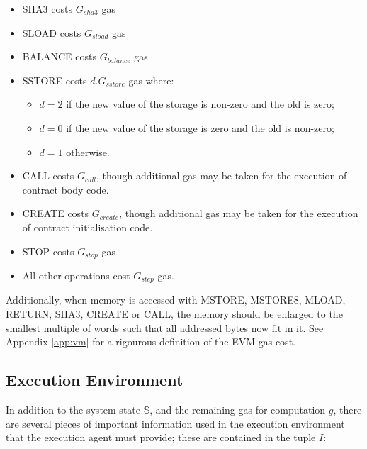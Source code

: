 \documentclass[9pt,oneside]{amsart}
\begin{document}
\begin{multicols}{2}
\begin{itemize}
\item {\small SHA3} costs $G_{sha3}$ gas
\item {\small SLOAD} costs $G_{sload}$ gas
\item {\small BALANCE} costs $G_{balance}$ gas
\item {\small SSTORE} costs $d.G_{sstore}$ gas where:
\begin{itemize}
\item $d = 2$ if the new value of the storage is non-zero and the old is zero;
\item $d = 0$ if the new value of the storage is zero and the old is non-zero;
\item $d = 1$ otherwise.
\end{itemize}
\item {\small CALL} costs $G_{call}$, though additional gas may be taken for the execution of contract body code.
\item {\small CREATE} costs $G_{create}$, though additional gas may be taken for the execution of contract initialisation code.
\item {\small STOP} costs $G_{stop}$ gas
\item All other operations cost $G_{step}$ gas.
\end{itemize}

Additionally, when memory is accessed with {\small MSTORE}, {\small MSTORE8}, {\small MLOAD}, {\small RETURN}, {\small SHA3}, {\small CREATE} or {\small CALL}, the memory should be enlarged to the smallest multiple of words such that all addressed bytes now fit in it. See Appendix \ref{app:vm} for a rigourous definition of the EVM gas cost.


\subsection{Execution Environment}

In addition to the system state $\mathbb{S}$, and the remaining gas for computation $g$, there are several pieces of important information used in the execution environment that the execution agent must provide; these are contained in the tuple $I$:


\end{multicols}
\end{document}

